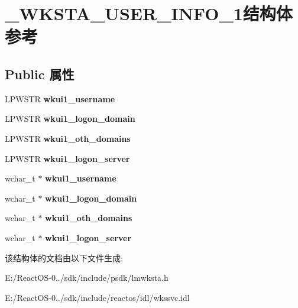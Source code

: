 \hypertarget{struct___w_k_s_t_a___u_s_e_r___i_n_f_o__1}{}\section{\+\_\+\+W\+K\+S\+T\+A\+\_\+\+U\+S\+E\+R\+\_\+\+I\+N\+F\+O\+\_\+1结构体 参考}
\label{struct___w_k_s_t_a___u_s_e_r___i_n_f_o__1}
\subsection*{Public 属性}
\begin{DoxyCompactItemize}
\item 
\mbox{\label{struct___w_k_s_t_a___u_s_e_r___i_n_f_o__1_a923dcaba9f7914189140918f0a543ced}} 
L\+P\+W\+S\+TR {\bfseries wkui1\+\_\+username}
\item 
\mbox{\label{struct___w_k_s_t_a___u_s_e_r___i_n_f_o__1_aa14cb272415ec736d27035f2ed1e000e}} 
L\+P\+W\+S\+TR {\bfseries wkui1\+\_\+logon\+\_\+domain}
\item 
\mbox{\label{struct___w_k_s_t_a___u_s_e_r___i_n_f_o__1_a085390c877ebe40566b4b960b7abd86c}} 
L\+P\+W\+S\+TR {\bfseries wkui1\+\_\+oth\+\_\+domains}
\item 
\mbox{\label{struct___w_k_s_t_a___u_s_e_r___i_n_f_o__1_afea8e6eeb18ccee0b2268b417c0781e2}} 
L\+P\+W\+S\+TR {\bfseries wkui1\+\_\+logon\+\_\+server}
\item 
\mbox{\label{struct___w_k_s_t_a___u_s_e_r___i_n_f_o__1_af59bee58508a8f60599497353be2645c}} 
wchar\+\_\+t $\ast$ {\bfseries wkui1\+\_\+username}
\item 
\mbox{\label{struct___w_k_s_t_a___u_s_e_r___i_n_f_o__1_acf21cc02a7b37ea8afe18f80eaa73fff}} 
wchar\+\_\+t $\ast$ {\bfseries wkui1\+\_\+logon\+\_\+domain}
\item 
\mbox{\label{struct___w_k_s_t_a___u_s_e_r___i_n_f_o__1_a4eb73bc70e2fddfa83e166751a041c68}} 
wchar\+\_\+t $\ast$ {\bfseries wkui1\+\_\+oth\+\_\+domains}
\item 
\mbox{\label{struct___w_k_s_t_a___u_s_e_r___i_n_f_o__1_ab89f614e34234d100f015a0225b6d841}} 
wchar\+\_\+t $\ast$ {\bfseries wkui1\+\_\+logon\+\_\+server}
\end{DoxyCompactItemize}


该结构体的文档由以下文件生成\+:\begin{DoxyCompactItemize}
\item 
E\+:/\+React\+O\+S-\/0../sdk/include/psdk/lmwksta.\+h\item 
E\+:/\+React\+O\+S-\/0../sdk/include/reactos/idl/wkssvc.\+idl\end{DoxyCompactItemize}
